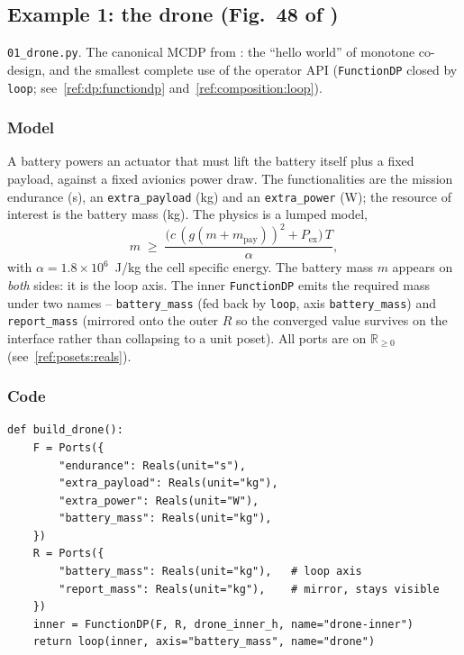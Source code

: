 \documentclass[11pt,a4paper]{article}
\newcommand{\Rplus}{\mathbb{R}_{\geq 0}}
\begin{document}
\subsection{Example 1: the drone (Fig.~48 of \citealp{censi2015mathematical})}\label{ex:01}

\texttt{01\_drone.py}. The canonical MCDP from
\citet{censi2015mathematical}: the
``hello world'' of monotone co-design, and the smallest complete use of
the operator API (\texttt{FunctionDP} closed by \texttt{loop};
see~\ref{ref:dp:functiondp} and~\ref{ref:composition:loop}).

\subsubsection*{Model}

A battery powers an actuator that must lift the battery itself plus a
fixed payload, against a fixed avionics power draw. The functionalities
are the mission endurance (s), an \texttt{extra\_payload} (kg) and an
\texttt{extra\_power} (W); the resource of interest is the battery mass
(kg). The physics is a lumped model,
\[
  m \;\geq\; \frac{\bigl(c\,(g(m+m_{\text{pay}}))^2 + P_{\text{ex}}\bigr)\,T}
                  {\alpha},
\]
with $\alpha = 1.8\times10^6$~J/kg the cell specific energy. The battery
mass $m$ appears on \emph{both} sides: it is the loop axis. The inner
\texttt{FunctionDP} emits the required mass under two names --
\texttt{battery\_mass} (fed back by \texttt{loop}, axis
\texttt{battery\_mass}) and \texttt{report\_mass} (mirrored onto the
outer $R$ so the converged value survives on the interface rather than
collapsing to a unit poset). All ports are on $\Rplus$
(see~\ref{ref:posets:reals}).

\subsubsection*{Code}

\begin{lstlisting}
def build_drone():
    F = Ports({
        "endurance": Reals(unit="s"),
        "extra_payload": Reals(unit="kg"),
        "extra_power": Reals(unit="W"),
        "battery_mass": Reals(unit="kg"),
    })
    R = Ports({
        "battery_mass": Reals(unit="kg"),   # loop axis
        "report_mass": Reals(unit="kg"),    # mirror, stays visible
    })
    inner = FunctionDP(F, R, drone_inner_h, name="drone-inner")
    return loop(inner, axis="battery_mass", name="drone")
\end{lstlisting}
\end{document}
